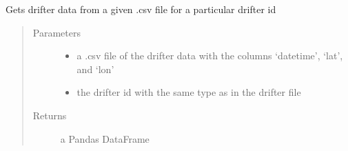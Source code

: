 \documentclass[letterpaper,10pt,english]{sphinxmanual}
\begin{document}
\begin{fulllineitems}
\label{\detokenize{octapy:octapy.tools.get_drifter_data}}
\sphinxAtStartPar
Gets drifter data from a given .csv file for a particular drifter id
\begin{quote}\begin{description}
\item[{Parameters}] \leavevmode\begin{itemize}
\item {} 
\sphinxAtStartPar
{} \textendash{} a .csv file of the drifter data with the columns ‘datetime’, ‘lat’, and
‘lon’

\item {} 
\sphinxAtStartPar
{} \textendash{} the drifter id with the same type as in the drifter file

\end{itemize}

\item[{Returns}] \leavevmode
\sphinxAtStartPar
a Pandas DataFrame

\end{description}\end{quote}

\end{fulllineitems}

\end{document}
